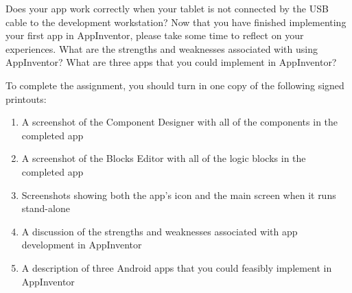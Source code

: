 Does your app work correctly when your tablet is not connected by the USB cable to the development workstation? Now that
you have finished implementing your first app in AppInventor, please take some time to reflect on your experiences.
What are the strengths and weaknesses associated with using AppInventor? What are three apps that you could
implement in AppInventor?


\vspace*{.05in}
\noindent
To complete the assignment, you should turn in one copy of the following signed printouts: 
\vspace*{-.06in}

\begin{enumerate}
	\itemsep0em
	\item A screenshot of the Component Designer with all of the components in the completed app
	\item A screenshot of the Blocks Editor with all of the logic blocks in the completed app 
	\item Screenshots showing both the app's icon and the main screen when it runs stand-alone
	\item A discussion of the strengths and weaknesses associated with app development in AppInventor
	\item A description of three Android apps that you could feasibly implement in AppInventor
\end{enumerate}

% 
% 		
% 
% 
% 
% 
% 

